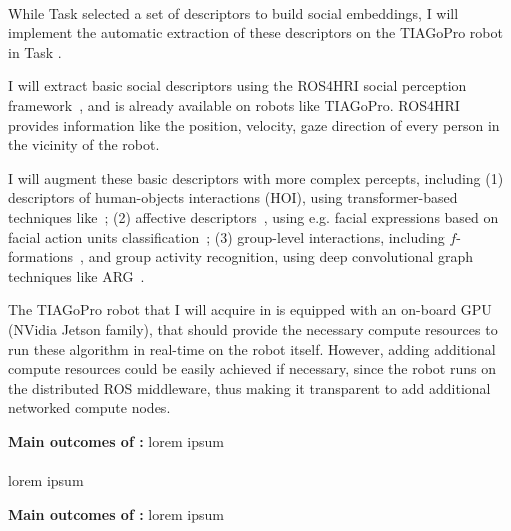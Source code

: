 \paragraph{\TCA}

While Task \tAA selected a set of descriptors to build social embeddings, I will implement the automatic extraction of these descriptors on the TIAGoPro robot in Task \TCA.

I will extract basic social descriptors using the ROS4HRI social perception
framework~\cite{lemaignan2022ros}, and is already available on robots like
TIAGoPro. ROS4HRI provides information like the position, velocity, gaze
direction of every person in the vicinity of the robot. 

I will augment these basic descriptors with more complex percepts, including
(1) descriptors of human-objects interactions (HOI), using transformer-based
techniques like~\cite{iftekhar2022what}; (2) affective
descriptors~\cite{vinciarelli2009social}, using e.g. facial expressions based
on facial action units classification~\cite{martinez2019automatic}; (3)
group-level interactions, including $f$-formations~\cite{setti2015fformation},
and group activity recognition, using deep convolutional graph techniques like
ARG~\cite{wu2019learning}.

The TIAGoPro robot that I will acquire in \project is equipped with an on-board
GPU (NVidia Jetson family), that should provide the necessary compute resources
to run these algorithm in real-time on the robot itself. However, adding
additional compute resources could be easily achieved if necessary, since the
robot runs on the distributed ROS middleware, thus making it transparent to add
additional networked compute nodes.

\begin{framed}
    {\noindent\bf Main outcomes of \tCA:} lorem ipsum 
\end{framed}

\paragraph{\TCB}

lorem ipsum

\begin{framed}
    {\noindent\bf Main outcomes of \tCB:} lorem ipsum 
\end{framed}

\paragraph{\TCC}

